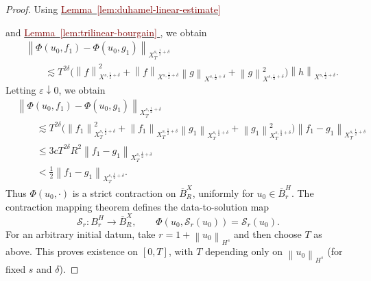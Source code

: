 \documentclass[12pt,oneside,reqno]{amsart}
\newcommand{\lemref}[1]{%
    \hyperref[#1]{%
        \textcolor{Maroon}{Lemma~\ref*{#1}}%
    }%
}
\numberwithin{equation}{section}
\theoremstyle{plain}
\newcommand{\norm}[1]{%
    \left\lVert #1\right\rVert%
}
\newcommand{\xnorm}[3]{%
    \left\lVert #1\right\rVert_{X^{{#2},{#3}}}%
}
\newcommand{\xtnorm}[3]{%
    \left\lVert #1\right\rVert_{X^{{#2},{#3}}_T}%
}
\begin{document}
\begin{proof}
Using
\lemref{lem:duhamel-linear-estimate}
and
\lemref{lem:trilinear-bourgain},
we obtain
\begin{align*}
&
\xtnorm{
    \Phi(u_0,f_1)-\Phi(u_0,g_1)
}{s}{\frac12+\delta}
\\
&\qquad\lesssim
T^{2\delta}
\Big(
    \xnorm{f}{s}{\frac12+\delta}^2
    +
    \xnorm{f}{s}{\frac12+\delta}
    \xnorm{g}{s}{\frac12+\delta}
    +
    \xnorm{g}{s}{\frac12+\delta}^2
\Big)
\xnorm{h}{s}{\frac12+\delta}.
\end{align*}
Letting $\varepsilon\downarrow0$, we obtain
\begin{align*}
&
\xtnorm{
    \Phi(u_0,f_1)-\Phi(u_0,g_1)
}{s}{\frac12+\delta}
\\
&\qquad\lesssim
T^{2\delta}
\Big(
    \xtnorm{f_1}{s}{\frac12+\delta}^2
    +
    \xtnorm{f_1}{s}{\frac12+\delta}
    \xtnorm{g_1}{s}{\frac12+\delta}
    +
    \xtnorm{g_1}{s}{\frac12+\delta}^2
\Big)
\xtnorm{f_1-g_1}{s}{\frac12+\delta}
\\
&\qquad\leq
3cT^{2\delta}R^2
\xtnorm{f_1-g_1}{s}{\frac12+\delta}
\\
&\qquad<
\frac12
\xtnorm{f_1-g_1}{s}{\frac12+\delta}.
\end{align*}
Thus $\Phi(u_0,\cdot)$ is a strict contraction on $\overline B_R^X$,
uniformly for $u_0\in\overline B_r^H$. The contraction mapping theorem
defines the data-to-solution map
\begin{equation*}
    \mathcal S_r:B_r^H\longrightarrow\overline B_R^X,
    \qquad
    \Phi(u_0,\mathcal S_r(u_0))=\mathcal S_r(u_0).
\end{equation*}
For an arbitrary initial datum, take $r=1+\norm{u_0}_{H^s}$ and then choose
$T$ as above. This proves existence on $[0,T]$, with $T$ depending only on
$\norm{u_0}_{H^s}$ (for fixed $s$ and $\delta$).


\end{proof}
\end{document}
